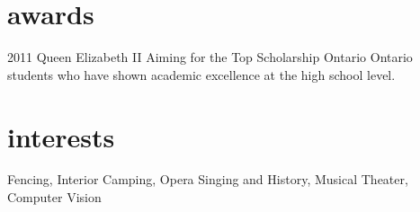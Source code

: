 \documentclass[]{eliot-cv} %
\begin{document}

\section{awards}

\begin{entrylist}
\entry
{2011}
{Queen Elizabeth II Aiming for the Top Scholarship}
{Ontario}
{Ontario students who have shown academic excellence at the high school level.}
\end{entrylist}


\section{interests}

Fencing, Interior Camping, Opera Singing and History, Musical Theater, Computer Vision
\end{document}
